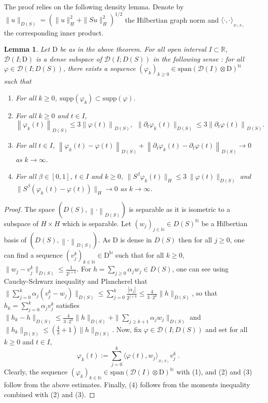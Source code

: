 \documentclass[11pt, letterpaper]{amsart}
\newtheorem{lem}[thm]{Lemma}
\theoremstyle{definition}
\theoremstyle{remark}
\numberwithin{equation}{section}
\begin{document}
 

The proof relies on the following density lemma. Denote by $\| u \|_{D(S)}=(\|u\|_H^2+\| Su\|_{H}^2)^{1/2}$ the Hilbertian graph norm  and $ \langle \cdot,\cdot\rangle_{_{D(S)}} $ the corresponding  inner product.
\begin{lem}\label{lem: densité D}  Let $\mathrm{D}$ be as in the above theorem.
    For all open interval $I \subset \mathbb{R}$, $\mathcal{D}(I;\mathrm{D})$ is a dense subspace of $\mathcal{D}(I;D(S))$ in the following sense :  for all $\varphi \in \mathcal{D}(I; D(S))$, there exists a sequence $(\varphi_k)_{k \geq 0} \in  \mathrm{span}(\mathcal{D}(I)\otimes \mathrm{D})^{\mathbb{N}} $ such that 
    \begin{enumerate}
        \item For all $k \geq 0$, $\mathrm{supp}(\varphi_k) \subset \mathrm{supp}(\varphi)$.
        \item For all $k \geq 0$ and $t \in I$,
        $$  \left\|\varphi_k(t) \right\|_{D(S)} \leq 3  \left\| \varphi(t) \right\|_{D(S)}, \ \ \|\partial_t \varphi_k(t) \|_{D(S)}  \leq 3 \left\| \partial_t \varphi(t) \right\|_{D(S)} .$$
        \item For all $t \in I$, $\left\|\varphi_k(t)-\varphi(t) \right\|_{D(S)}+\left\|\partial_t \varphi_k(t) - \partial_t \varphi(t) \right\|_{D(S)}\to 0$ as $k\to \infty$.
        \item For all $\beta \in [0,1]$, $t\in I$ and $k\geq 0$, $\| S^\beta  \varphi_k(t)\|_H \le 3\ \| \varphi(t)  \|_{D(S)} $ and $\| S^\beta(  \varphi_k(t)- \varphi(t) ) \|_H \to 0$ as $k\to \infty$. 
    \end{enumerate}

\end{lem}
\begin{proof}
The space $(D(S),\left\| \cdot \right\|_{D(S)})$ is separable as it is isometric to a subspace of $H\times H$ which is separable. Let $(w_j)_{j\in \mathbb{N}} \in D(S)^\mathbb{N}$ be a Hilbertian basis of $ \left( D(S),\left\| \cdot \right\|_{D(S)} \right)$. As $\mathrm{D}$ is dense in $D(S)$ then for all $j\ge 0$, one can find a sequence $(v_j^k)_{k\in \mathbb{N}} \in \mathrm{D}^\mathbb{N}$ such that for all $k \ge 0$, $\| w_j-v_j^k \|_{D(S)} \leq \frac{1}{2^{j+k}} $. For  $h=\sum_{j\ge 0} \alpha_j w_j\in D(S)$, one can see using Cauchy-Schwarz inequality and Plancherel  that $\|\sum_{j=0}^k \alpha_j (v_j^k-w_j)\|_{D(S)} \le \sum_{j=0}^k \frac{|\alpha_j|}{2^{j+k}} \le  \frac{4}{3\cdot 2^k}\|h\|_{D(S)}$, so that $h_k=\sum_{j=0}^k \alpha_j v_j^k$ satisfies  $\|h_k-h\|_{D(S)} \le \frac{4}{3\cdot 2^k}\|h\|_{D(S)} + \|\sum_{j\ge k+1} \alpha_j w_j\|_{D(S)}$ and $\|h_k\|_{D(S)} \le (\frac{4}{3}+1)\|h\|_{D(S)}$. 
Now, fix $\varphi \in \mathcal{D}(I;D(S))$ and set for all $k \ge 0$ and $t \in I$,
    $$ \varphi_k(t):= \sum_{j=0}^{k} \langle \varphi(t),w_j\rangle_{_{D(S)}}   v_j^k \ . $$
Clearly, the sequence $ (\varphi_k)_{k \in \mathbb{N}} \in \mathrm{span}(\mathcal{D}(I)\otimes \mathrm{D})^{\mathbb{N}}$ with (1), and (2) and (3) follow from the above estimates.  Finally, (4) follows  from the moments inequality combined with (2) and (3).
\end{proof}
\end{document}
